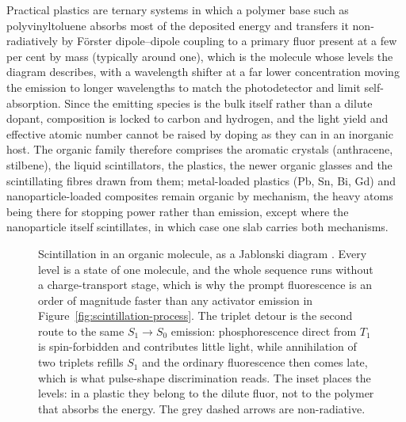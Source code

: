 Practical plastics are ternary systems in which a polymer base such as polyvinyltoluene absorbs most of the deposited energy and transfers it non-radiatively by F\"orster dipole--dipole coupling to a primary fluor present at a few per cent by mass (typically around one), which is the molecule whose levels the diagram describes, with a wavelength shifter at a far lower concentration moving the emission to longer wavelengths to match the photodetector and limit self-absorption.
Since the emitting species is the bulk itself rather than a dilute dopant, composition is locked to carbon and hydrogen, and the light yield and effective atomic number cannot be raised by doping as they can in an inorganic host.
The organic family therefore comprises the aromatic crystals (anthracene, stilbene), the liquid scintillators, the plastics, the newer organic glasses and the scintillating fibres drawn from them; metal-loaded plastics (Pb, Sn, Bi, Gd) and nanoparticle-loaded composites remain organic by mechanism, the heavy atoms being there for stopping power rather than emission, except where the nanoparticle itself scintillates, in which case one slab carries both mechanisms.

\begin{figure}[tbp]
	\centering
	
	\caption[Organic scintillation: the molecular energy levels]{%
		Scintillation in an organic molecule, as a Jablonski diagram \cite{Knoll2010}.
		Every level is a state of one molecule, and the whole sequence runs without a charge-transport stage, which is why the prompt fluorescence is an order of magnitude faster than any activator emission in Figure~\ref{fig:scintillation-process}.
		The triplet detour is the second route to the same $S_1 \rightarrow S_0$ emission: phosphorescence direct from $T_1$ is spin-forbidden and contributes little light, while annihilation of two triplets refills $S_1$ and the ordinary fluorescence then comes late, which is what pulse-shape discrimination reads.
		The inset places the levels: in a plastic they belong to the dilute fluor, not to the polymer that absorbs the energy.
		The grey dashed arrows are non-radiative.
	}
	\label{fig:organic-scintillation}
\end{figure}

\clearpage

